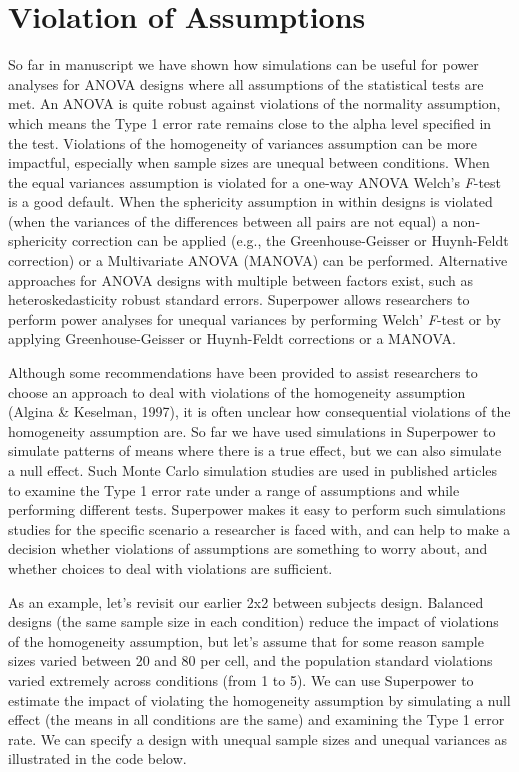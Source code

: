 \documentclass[,man,floatsintext]{apa6}
\begin{document}
\hypertarget{violation-of-assumptions}{%
\section{Violation of Assumptions}\label{violation-of-assumptions}}

So far in manuscript we have shown how simulations can be useful for power analyses for ANOVA designs where all assumptions of the statistical tests are met.
An ANOVA is quite robust against violations of the normality assumption, which means the Type 1 error rate remains close to the alpha level specified in the test. Violations of the homogeneity of variances assumption can be more impactful, especially when sample sizes are unequal between conditions.
When the equal variances assumption is violated for a one-way ANOVA Welch's \emph{F}-test is a good default.
When the sphericity assumption in within designs is violated (when the variances of the differences between all pairs are not equal) a non-sphericity correction can be applied (e.g., the Greenhouse-Geisser or Huynh-Feldt correction) or a Multivariate ANOVA (MANOVA) can be performed.
Alternative approaches for ANOVA designs with multiple between factors exist, such as heteroskedasticity robust standard errors.
Superpower allows researchers to perform power analyses for unequal variances by performing Welch' \emph{F}-test or by applying Greenhouse-Geisser or Huynh-Feldt corrections or a MANOVA.

Although some recommendations have been provided to assist researchers to choose an approach to deal with violations of the homogeneity assumption (Algina \& Keselman, 1997), it is often unclear how consequential violations of the homogeneity assumption are.
So far we have used simulations in Superpower to simulate patterns of means where there is a true effect, but we can also simulate a null effect.
Such Monte Carlo simulation studies are used in published articles to examine the Type 1 error rate under a range of assumptions and while performing different tests.
Superpower makes it easy to perform such simulations studies for the specific scenario a researcher is faced with, and can help to make a decision whether violations of assumptions are something to worry about, and whether choices to deal with violations are sufficient.

As an example, let's revisit our earlier 2x2 between subjects design.
Balanced designs (the same sample size in each condition) reduce the impact of violations of the homogeneity assumption, but let's assume that for some reason sample sizes varied between 20 and 80 per cell, and the population standard violations varied extremely across conditions (from 1 to 5).
We can use Superpower to estimate the impact of violating the homogeneity assumption by simulating a null effect (the means in all conditions are the same) and examining the Type 1 error rate.
We can specify a design with unequal sample sizes and unequal variances as illustrated in the code below.
\end{document}
